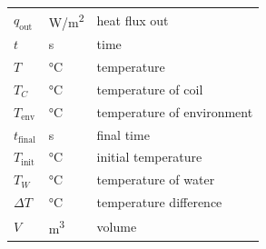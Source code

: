 \documentclass[12pt]{article}
\begin{document}
\begin{longtable*}{l l p{12cm}}
  $q_\text{out}$ & \si[per-mode=symbol] {\watt\per\square\metre} & heat flux out
  \\
  $t$ & \si[per-mode=symbol] {\second} & time
  \\
  $T$ & \si[per-mode=symbol] {\celsius} & temperature
  \\
  $T_C$ &\si[per-mode=symbol] {\celsius} & temperature of coil
  \\
  $T_\text{env}$ & \si[per-mode=symbol] {\celsius} & temperature of environment
  \\ 
  $t_\text{final}$ & \si[per-mode=symbol] {\second} & final time
  \\ 
  $T_\text{init}$ & \si[per-mode=symbol] {\celsius} & initial temperature
  \\
  $T_W$ & \si[per-mode=symbol] {\celsius} & temperature of water
  \\
  $\Delta T$ & \si[per-mode=symbol] {\celsius} & temperature difference
  \\
  $V$ & \si[per-mode=symbol] {\cubic\meter} & volume
  \\

\end{longtable*}
\end{document}
